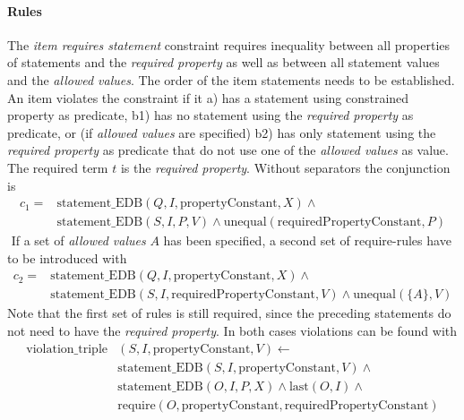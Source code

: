 \documentclass[hyperref,bachelorofscience,fleqn]{cgvpub}
\begin{document}
\paragraph{Rules}
The \emph{item requires statement} constraint requires inequality between all properties of statements and the \emph{required property} as well as between all statement values and the \emph{allowed values}. The order of the item statements needs to be established. An item violates the constraint if it a) has a statement using constrained property as predicate, b1) has no statement using the \emph{required property} as predicate, or (if \emph{allowed values} are specified) b2) has only statement using the \emph{required property} as predicate that do not use one of the \emph{allowed values} as value. The required term \(t\) is the \emph{required property}. Without separators the conjunction is
\begin{equation*}
\begin{split}
c_1 = &\text{statement\_EDB}(Q, I, \text{propertyConstant}, X) \wedge{} \\
&\text{statement\_EDB}(S, I, P, V) \wedge \text{unequal}(\text{requiredPropertyConstant}, P)
\end{split}
\end{equation*} \(\)
If a set of \emph{allowed values} \(A\) has been specified, a second set of require-rules have to be introduced with
\begin{equation*}
\begin{split}
c_2 = &\text{statement\_EDB}(Q, I, \text{propertyConstant}, X) \wedge{} \\
&\text{statement\_EDB}(S, I, \text{requiredPropertyConstant}, V) \wedge \text{unequal}(\{A\}, V)
\end{split}
\end{equation*}
Note that the first set of rules is still required, since the preceding statements do not need to have the \emph{required property}. In both cases violations can be found with
\begin{equation*}
\begin{split}
\text{violation\_triple}&(S, I, \text{propertyConstant}, V) \leftarrow \\
&\text{statement\_EDB}(S, I, \text{propertyConstant}, V) \wedge{} \\
&\text{statement\_EDB}(O, I, P, X) \wedge \text{last}(O, I) \wedge{} \\
&\text{require}(O, \text{propertyConstant}, \text{requiredPropertyConstant})
\end{split}
\end{equation*}
\end{document}

